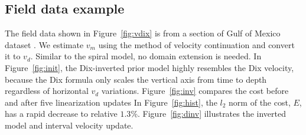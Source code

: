 \subsection{Field data example}

The field data shown in Figure~\ref{fig:vdix} is from a section of Gulf of Mexico dataset \cite[]{claerbout}. We 
estimate $v_m$ using the method of velocity continuation \cite[]{fomel1} and convert it to $v_d$. Similar to 
the spiral model, no domain extension is needed. In Figure~\ref{fig:init}, the Dix-inverted prior model highly 
resembles the Dix velocity, because the Dix formula only scales the vertical axis from time to depth regardless 
of horizontal $v_d$ variations. Figure~\ref{fig:inv} compares the cost before and after five linearization 
updates In Figure~\ref{fig:hist}, the 
$l_2$ norm of the cost, $E$, has a rapid decrease to relative $1.3$\%. Figure~\ref{fig:dinv} illustrates the 
inverted model and interval velocity update.

